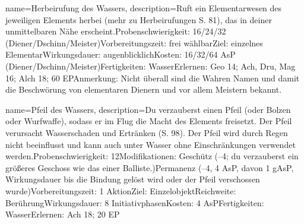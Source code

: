 {
    name={Herbeirufung des Wassers},
    description={Ruft ein Elementarwesen des jeweiligen Elements herbei (mehr zu Herbeirufungen S. 81), das in deiner unmittelbaren Nähe erscheint.\newline Probenschwierigkeit: 16/24/32 (Diener/Dschinn/Meister)\newline Vorbereitungszeit: frei wählbar\newline Ziel: einzelnes Elementar\newline Wirkungsdauer: augenblicklich\newline Kosten: 16/32/64 AsP (Diener/Dschinn/Meister)\newline Fertigkeiten: Wasser\newline Erlernen: Geo 14; Ach, Dru, Mag 16; Alch 18; 60 EP\newline Anmerkung: Nicht überall sind die Wahren Namen und damit die Beschwörung von elementaren Dienern und vor allem Meistern bekannt. }
}


{
    name={Pfeil des Wassers},
    description={Du verzauberst einen Pfeil (oder Bolzen oder Wurfwaffe), sodass er im Flug die Macht des Elements freisetzt. Der Pfeil verursacht Wasserschaden und Ertränken (S. 98). Der Pfeil wird durch Regen nicht beeinflusst und kann auch unter Wasser ohne Einschränkungen verwendet werden.\newline Probenschwierigkeit: 12\newline Modifikationen: Geschütz (–4; du verzauberst ein größeres Geschoss wie das einer Balliste.)\newline Permanenz (–4, 4 AsP, davon 1 gAsP, Wirkungsdauer bis die Bindung gelöst wird oder der Pfeil verschossen wurde)\newline Vorbereitungszeit: 1 Aktion\newline Ziel: Einzelobjekt\newline Reichweite: Berührung\newline Wirkungsdauer: 8 Initiativphasen\newline Kosten: 4 AsP\newline Fertigkeiten: Wasser\newline Erlernen: Ach 18; 20 EP}
}


